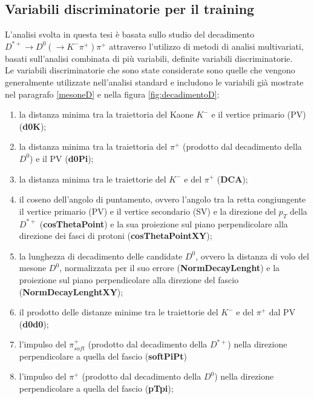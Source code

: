 \subsection{Variabili discriminatorie per il training}
L'analisi svolta in questa tesi \`e basata sullo studio del decadimento $D^{*+} \rightarrow D^0( \rightarrow K^- \pi^+)  \pi^+ $ attraverso l'utilizzo di metodi di analisi multivariati, basati sull'analisi combinata di pi\`u variabili, definite variabili discriminatorie. %
\\Le variabili discriminatorie che sono state considerate sono quelle che vengono generalmente utilizzate nell'analisi standard\cite{dati_ALICE} e includono le variabili gi\`a mostrate nel paragrafo \ref{mesoneD} e nella figura \ref{fig:decadimentoD}:       \begin{enumerate}
 \item la distanza minima tra la traiettoria del Kaone $K^-$  e il vertice primario (PV) (\textbf{d0K});
                \item la distanza minima tra la traiettoria del $\pi^+$ (prodotto dal decadimento della $D^0$) e il PV (\textbf{d0Pi});
            \item la distanza minima tra le traiettorie del $K^-$ e del $\pi^+$ (\textbf{DCA});
            \item il coseno dell'angolo di puntamento, ovvero l'angolo tra la retta congiungente il vertice primario (PV) e il vertice secondario (SV) e la direzione del $p_T$ della $D^{*+}$ (\textbf{cosThetaPoint})
            e la sua proiezione sul piano perpendicolare alla direzione dei fasci di protoni (\textbf{cosThetaPointXY});
            \item la lunghezza di decadimento delle candidate $D^0$, ovvero la distanza di volo del mesone $D^0$, normalizzata per il suo errore (\textbf{NormDecayLenght}) e la  proiezione sul piano perpendicolare alla direzione del fascio (\textbf{NormDecayLenghtXY});
            \item il prodotto delle distanze minime tra le traiettorie del  $K^-$ e del $\pi^+$ dal PV (\textbf{d0d0});
            \item l'impulso del $\pi^+_{soft}$ (prodotto dal decadimento della $D^{*+}$) nella direzione perpendicolare a quella del fascio (\textbf{softPiPt})
            \item l'impulso del $\pi^+$ (prodotto dal decadimento della $D^0$) nella direzione perpendicolare a quella del fascio (\textbf{pTpi});

\end{enumerate}
